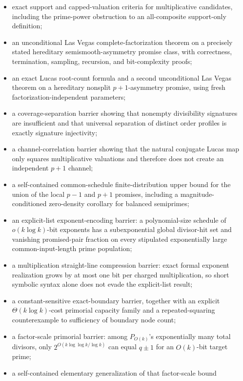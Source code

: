\documentclass[11pt]{article}
\begin{document}
\begin{itemize}
\item exact support and capped-valuation criteria for multiplicative
  candidates, including the prime-power obstruction to an all-composite
  support-only definition;
\item an unconditional Las Vegas complete-factorization theorem on a precisely
  stated hereditary semismooth-asymmetry promise class, with correctness,
  termination, sampling, recursion, and bit-complexity proofs;
\item an exact Lucas root-count formula and a second unconditional Las Vegas
  theorem on a hereditary nonsplit \(p+1\)-asymmetry promise, using fresh
  factorization-independent parameters;
\item a coverage-separation barrier showing that nonempty divisibility
  signatures are insufficient and that universal separation of distinct order
  profiles is exactly signature injectivity;
\item a channel-correlation barrier showing that the natural conjugate Lucas
  map only squares multiplicative valuations and therefore does not create an
  independent \(p+1\) channel;
\item a self-contained common-schedule finite-distribution upper bound for the
  union of the local \(p-1\) and \(p+1\) promises, including a
  magnitude-conditioned zero-density corollary for balanced semiprimes;
\item an explicit-list exponent-encoding barrier: a polynomial-size schedule
  of \(o(k\log k)\)-bit exponents has a subexponential global divisor-hit set
  and vanishing promised-pair fraction on every stipulated exponentially
  large common-input-length prime population;
\item a multiplication straight-line compression barrier: exact formal
  exponent realization grows by at most one bit per charged multiplication,
  so short symbolic syntax alone does not evade the explicit-list result;
\item a constant-sensitive exact-boundary barrier, together with an explicit
  \(\Theta(k\log k)\)-cost primorial capacity family and a repeated-squaring
  counterexample to sufficiency of boundary node count;
\item a factor-scale primorial barrier: among \(P_{O(k)}\)'s exponentially
  many total divisors, only \(2^{O(k\log\log k/\log k)}\) can equal
  \(q\pm1\) for an \(O(k)\)-bit target prime;
\item a self-contained elementary generalization of that factor-scale bound

\end{itemize}
\end{document}
